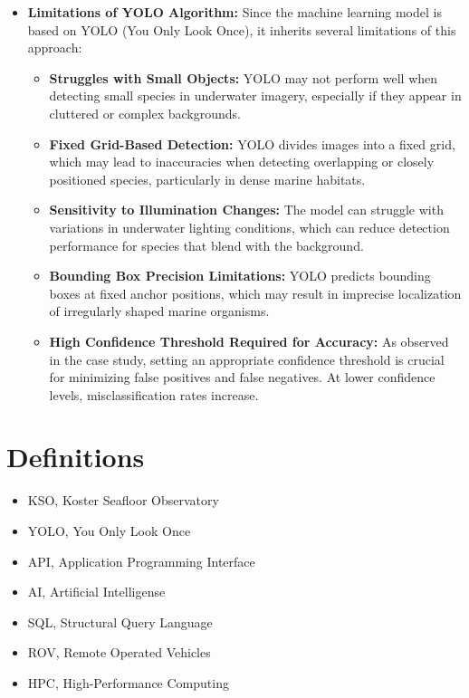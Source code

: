 \begin{itemize}
    \item \textbf{Limitations of YOLO Algorithm:} Since the machine learning model is based on YOLO (You Only Look Once), it inherits several limitations of this approach:
    \begin{itemize}
        \item \textbf{Struggles with Small Objects:} YOLO may not perform well when detecting small species in underwater imagery, especially if they appear in cluttered or complex backgrounds.
        \item \textbf{Fixed Grid-Based Detection:} YOLO divides images into a fixed grid, which may lead to inaccuracies when detecting overlapping or closely positioned species, particularly in dense marine habitats.
        \item \textbf{Sensitivity to Illumination Changes:} The model can struggle with variations in underwater lighting conditions, which can reduce detection performance for species that blend with the background.
        \item \textbf{Bounding Box Precision Limitations:} YOLO predicts bounding boxes at fixed anchor positions, which may result in imprecise localization of irregularly shaped marine organisms.
        \item \textbf{High Confidence Threshold Required for Accuracy:} As observed in the case study, setting an appropriate confidence threshold is crucial for minimizing false positives and false negatives. At lower confidence levels, misclassification rates increase.
    \end{itemize}

\end{itemize}

\section{Definitions}

\begin{itemize}
    \item KSO, Koster Seafloor Observatory
    \item YOLO, You Only Look Once
    \item API, Application Programming Interface
    \item AI, Artificial Intelligense
    \item SQL, Structural Query Language
    \item ROV, Remote Operated Vehicles
    \item HPC, High-Performance Computing
\end{itemize}